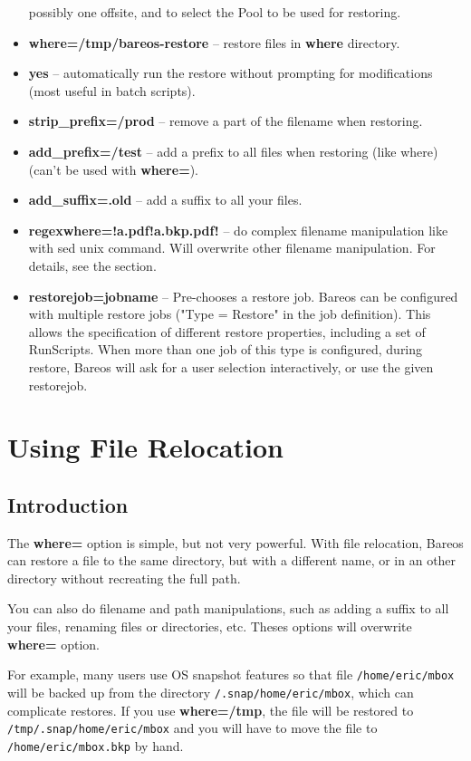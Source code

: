 \begin{itemize}
   possibly one offsite, and to select the Pool to  be used for restoring.
\item {\bf where=/tmp/bareos-restore} -- restore files in {\bf where} directory.
\item {\bf yes} -- automatically run the restore without prompting  for
   modifications (most useful in batch scripts).
\item {\bf strip\_prefix=/prod} -- remove a part of the filename when restoring.
\item {\bf add\_prefix=/test} -- add a prefix to all files when restoring (like
  where) (can't be used with {\bf where=}).
\item {\bf add\_suffix=.old} -- add a suffix to all your files.
\item {\bf regexwhere=!a.pdf!a.bkp.pdf!} -- do complex filename manipulation
  like with sed unix command. Will overwrite other filename manipulation. 
  For details, see the  section.
\item {\bf restorejob=jobname} -- Pre-chooses a restore job. Bareos can be
  configured with multiple restore jobs ("Type = Restore" in the job
  definition). This allows the specification of different restore properties,
  including a set of RunScripts. When more than one job of this type is
  configured, during restore, Bareos will ask for a user selection
  interactively, or use the given restorejob.
\end{itemize}

\section{Using File Relocation}
\label{filerelocation}
\label{restorefilerelocation}

\subsection*{Introduction}

The \textbf{where=} option is simple, but not very powerful. With file
relocation, Bareos can restore a file to the same directory, but with a
different name, or in an other directory without recreating the full path.

You can also do filename and path manipulations,
such as adding a suffix to all your files, renaming files
or directories, etc.  Theses options will overwrite {\bf where=} option.


For example, many users use OS snapshot features so that file
\texttt{/home/eric/mbox} will be backed up from the directory
\texttt{/.snap/home/eric/mbox}, which can complicate restores.  If you use
\textbf{where=/tmp}, the file will be restored to
\texttt{/tmp/.snap/home/eric/mbox} and you will have to move the file to
\texttt{/home/eric/mbox.bkp} by hand.

